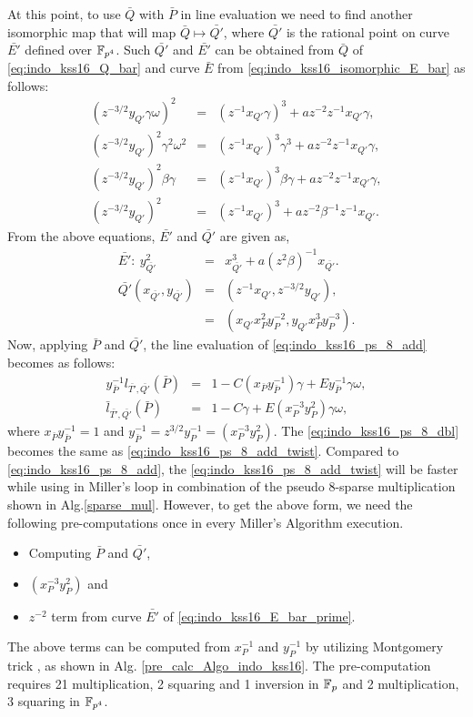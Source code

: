 At this point, to use $\bar{Q}$ with $\bar{P}$ in line evaluation we need to find another isomorphic map that will map $\bar{Q} \mapsto \bar{Q'}$, where $\bar{Q'}$ is the rational point on curve  $\bar{E'}$ defined over $\mathbb{F}_{p^4}$. Such $\bar{Q'}$ and $\bar{E'}$ can be obtained from $\bar{Q}$ of \eqref{eq:indo_kss16_Q_bar} and curve $\bar{E}$ from \eqref{eq:indo_kss16_isomorphic_E_bar} as follows:
\begin{eqnarray} 
(z^{-3/2}y_{Q'}\gamma \omega )^2 &=& (z^{-1}x_{Q'}\gamma)^3+az^{-2}z^{-1}x_{Q'}\gamma, \nonumber \\
(z^{-3/2}y_{Q'})^2\gamma^2 \omega^2 &=& (z^{-1}x_{Q'})^3\gamma^3+az^{-2}z^{-1}x_{Q'}\gamma, \nonumber \\
(z^{-3/2}y_{Q'})^2 \beta \gamma &=& (z^{-1}x_{Q'})^3 \beta \gamma+az^{-2}z^{-1}x_{Q'}\gamma, \nonumber \\
(z^{-3/2}y_{Q'})^2  &=& (z^{-1}x_{Q'})^3+az^{-2}\beta^{-1} z^{-1}x_{Q'}. \nonumber
\end{eqnarray}
From the above equations, $\bar{E'}$ and $\bar{Q'}$ are given as,
\begin{eqnarray}
\bar{E'}: ~y_{\bar{Q'}}^2 & = & x_{\bar{Q'}}^3+a(z^2\beta)^{-1}x_{\bar{Q'}}. \label{eq:indo_kss16_E_bar_prime}\\
\bar{Q'}(x_{\bar{Q'}}, y_{\bar{Q'}}) & = & (z^{-1}x_{Q'}, z^{-3/2}y_{Q'}), \nonumber \\
& = &(x_{Q'} x_P^2y_P^{-2},y_{Q'} x_P^3y_{P}^{-3}) \label{eq:indo_kss16_Q_bar_prime}. 
\end{eqnarray}
Now, applying $\bar{P}$ and $\bar{Q'}$, the line evaluation of  \eqref{eq:indo_kss16_ps_8_add} becomes as follows:
\begin{eqnarray}
y_{\bar{P}}^{-1} l_{\bar{T'},\bar{Q'}}(\bar{P})&=& 1-C(x_{\bar{P}}y_{\bar{P}}^{-1})\gamma+E y_{\bar{P}}^{-1}\gamma \omega,  \nonumber \\
\bar{l}_{\bar{T'},\bar{Q'}}(\bar{P}) &=& 1 -C\gamma+E (x_{P}^{-3} y_{P}^2)\gamma \omega, \label{eq:indo_kss16_ps_8_add_twist}
\end{eqnarray}
where $x_{\bar{P}}y_{\bar{P}}^{-1}=1$ and $y_{\bar{P}}^{-1} = z^{3/2}y_{P}^{-1}=(x_{P}^{-3} y_{P}^2)$. The \eqref{eq:indo_kss16_ps_8_dbl} becomes the same as \eqref{eq:indo_kss16_ps_8_add_twist}. 
Compared to \eqref{eq:indo_kss16_ps_8_add}, the \eqref{eq:indo_kss16_ps_8_add_twist} will be faster while using in Miller's loop in combination of the pseudo 8-sparse multiplication shown in Alg.\ref{sparse_mul}.
However, to get the above form, we need the following pre-computations once in every Miller's Algorithm execution.
\begin{itemize}
\item Computing $\bar{P}$ and $\bar{Q'}$,
\item $(x_{P}^{-3} y_{P}^{2})$ and
\item $z^{-2}$ term from curve $\bar{E'}$ of \eqref{eq:indo_kss16_E_bar_prime}.
\end{itemize}
The above terms can be computed from $x_{P}^{-1}$ and $y_P^{-1}$ by utilizing Montgomery trick \cite{mont_trick}, as shown in Alg. \ref{pre_calc_Algo_indo_kss16}. 
The pre-computation requires 21 multiplication, 2 squaring and 1 inversion in ${\mathbb{F}}_{p}$ and 2 multiplication, 3 squaring  in $\mathbb{F}_{p^4}$.


